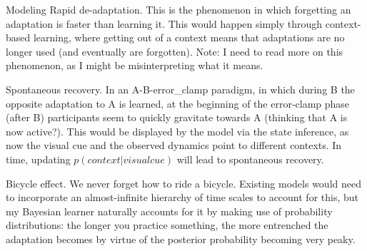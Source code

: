 \documentclass{report}
\begin{document}
\begin{chapter}{Modeling}
Rapid de-adaptation. This is the phenomenon in which forgetting an adaptation is
faster than learning it. This would happen simply through context-based
learning, where getting out of a context means that adaptations are no longer
used (and eventually are forgotten). Note: I need to read more on this
phenomenon, as I might be misinterpreting what it means.

Spontaneous recovery. In an A-B-error\_clamp paradigm, in which during B the
opposite adaptation to A is learned, at the beginning of the error-clamp phase
(after B) participants seem to quickly gravitate towards A (thinking that A is
now active?). This would be displayed by the model via the state inference, as
now the visual cue and the observed dynamics point to different contexts. In
time, updating $p(context | visual cue)$ will lead to spontaneous recovery.

Bicycle effect. We never forget how to ride a bicycle. Existing models would
need to incorporate an almost-infinite hierarchy of time scales to account for
this, but my Bayesian learner naturally accounts for it by making use of
probability distributions: the longer you practice something, the more
entrenched the adaptation becomes by virtue of the posterior probability
becoming very peaky.


\end{chapter}

\end{document}
